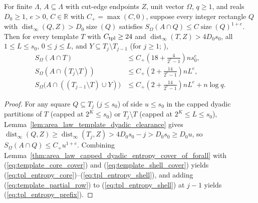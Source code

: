 \begin{lemma}
    \label{thm:area_template_safe_box_entropy}
    \leanok
    For finite $\Lambda$, $A\subseteq\Lambda$ with cut-edge endpoints $Z$, unit vector $\Omega$, $q\ge1$, and reals $D_0\ge1$, $e>0$, $C\in\mathbb R$ with $C_+=\max(C,0)$, suppose every integer rectangle $Q$ with $\operatorname{dist}_\infty(Q,Z)>D_0\operatorname{size}(Q)$ satisfies $S_\Omega(A\cap Q)\le C\operatorname{size}(Q)^{1+e}$.
    Then for every template $T$ with $C_{\rm tpl}\ge24$ and $\operatorname{dist}_\infty(T,Z)>4D_0s_0$, all $1\le L\le s_0$, $0\le j\le L$, and $Y\subseteq T_j\setminus T_{j-1}$ (for $j\ge1$; \cite[Lemma~9.4]{OpenAI2026AreaLaw}),
    \begin{align}
        S_\Omega(A\cap T)
         & \le C_+\left(18+\frac{4}{2^e-1}\right)ns_0^e, \label{eq:tpl_entropy_core}         \\
        S_\Omega(A\cap(T_j\setminus T))
         & \le C_+\left(2+\frac{14}{2^e-1}\right)nL^e, \label{eq:tpl_entropy_shell}          \\
        S_\Omega\bigl(A\cap((T_{j-1}\setminus T)\cup Y)\bigr)
         & \le C_+\left(2+\frac{14}{2^e-1}\right)nL^e+n\log q. \label{eq:tpl_entropy_prefix}
    \end{align}
\end{lemma}
\begin{proof}\leanok
    For any square $Q\subseteq T_j$ ($j\le s_0$) of side $u\le s_0$ in the capped dyadic partitions of $T$ (capped at $2^K\le s_0$) or $T_j\setminus T$ (capped at $2^K\le L\le s_0$), Lemma~\ref{lem:area_law_template_dyadic_clearance} gives $\operatorname{dist}_\infty(Q,Z)\ge\operatorname{dist}_\infty(T_j,Z)>4D_0s_0-j>D_0s_0\ge D_0u$, so $S_\Omega(A\cap Q)\le C_+u^{1+e}$.
    Combining Lemma~\ref{thm:area_law_capped_dyadic_entropy_cover_of_forall} with (\ref{eq:template_core_cover}) and (\ref{eq:template_shell_cover}) yields (\ref{eq:tpl_entropy_core})--(\ref{eq:tpl_entropy_shell}), and adding (\ref{eq:template_partial_row}) to (\ref{eq:tpl_entropy_shell}) at $j-1$ yields (\ref{eq:tpl_entropy_prefix}).
\end{proof}

